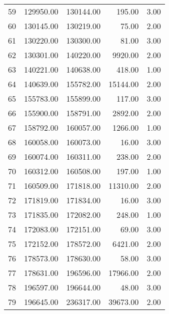 \begin{tabular}{rrrrr}
  59 & 129950.00 & 130144.00 & 195.00 & 3.00 \\ 
  60 & 130145.00 & 130219.00 & 75.00 & 2.00 \\ 
  61 & 130220.00 & 130300.00 & 81.00 & 3.00 \\ 
  62 & 130301.00 & 140220.00 & 9920.00 & 2.00 \\ 
  63 & 140221.00 & 140638.00 & 418.00 & 1.00 \\ 
  64 & 140639.00 & 155782.00 & 15144.00 & 2.00 \\ 
  65 & 155783.00 & 155899.00 & 117.00 & 3.00 \\ 
  66 & 155900.00 & 158791.00 & 2892.00 & 2.00 \\ 
  67 & 158792.00 & 160057.00 & 1266.00 & 1.00 \\ 
  68 & 160058.00 & 160073.00 & 16.00 & 3.00 \\ 
  69 & 160074.00 & 160311.00 & 238.00 & 2.00 \\ 
  70 & 160312.00 & 160508.00 & 197.00 & 1.00 \\ 
  71 & 160509.00 & 171818.00 & 11310.00 & 2.00 \\ 
  72 & 171819.00 & 171834.00 & 16.00 & 3.00 \\ 
  73 & 171835.00 & 172082.00 & 248.00 & 1.00 \\ 
  74 & 172083.00 & 172151.00 & 69.00 & 3.00 \\ 
  75 & 172152.00 & 178572.00 & 6421.00 & 2.00 \\ 
  76 & 178573.00 & 178630.00 & 58.00 & 3.00 \\ 
  77 & 178631.00 & 196596.00 & 17966.00 & 2.00 \\ 
  78 & 196597.00 & 196644.00 & 48.00 & 3.00 \\ 
  79 & 196645.00 & 236317.00 & 39673.00 & 2.00 \\ 
   \hline
\end{tabular}
\endgroup

